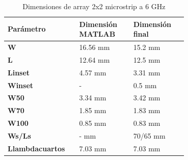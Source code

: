\begin{table}[H]
  
   \label{tab:array2x22}
   \small %
   \centering %
   \begin{tabular}{m{0.2\linewidth}m{0.25\linewidth}m{0.25\linewidth}} %
   \toprule[\heavyrulewidth]\toprule[\heavyrulewidth]
   \textbf{Parámetro} & \textbf{Dimensión MATLAB} & \textbf{Dimensión final} \\ 
   \midrule
   \textbf{W} & 16.56 mm & 15.2 mm \\
   \textbf{L} & 12.64 mm & 12.5 mm\\
   \textbf{Linset} & 4.57 mm & 3.31 mm\\
   \textbf{Winset} & - & 0.5 mm\\
   \textbf{W50} & 3.34 mm & 3.42 mm\\
   \textbf{W70} & 1.85 mm & 1.83 mm\\
   \textbf{W100} & 0.85 mm & 0.83 mm\\
   \textbf{Ws/Ls} & - mm & 70/65 mm\\
   \textbf{Llambdacuartos} & 7.03 mm & 7.03 mm\\
   \bottomrule[\heavyrulewidth] 
   \end{tabular}
   \caption{Dimensiones de array 2x2 microstrip a 6 GHz} 
\end{table}





